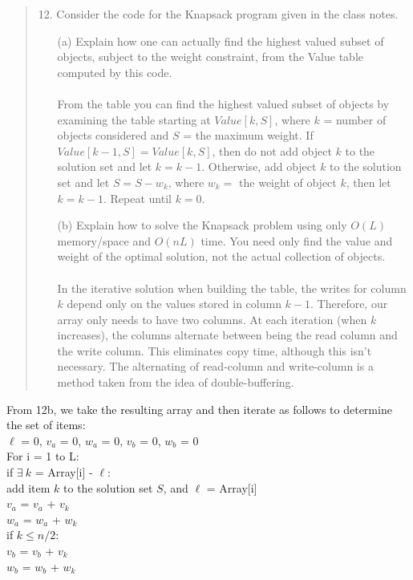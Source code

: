 \documentclass[10pt]{article}
\newcommand{\tab}{\hspace*{2em}}
\newcommand{\tabb}{\hspace*{4em}}
\newcommand{\tabbb}{\hspace*{6em}}
\newcommand{\tabbbb}{\hspace*{8em}}
\begin{document}
\begin{enumerate}
							\begin{quotation}
								12. 	Consider the code for the Knapsack program given in the class notes.
								\begin{enumerate}
								\item[(a)]	Explain how one can actually find the highest valued subset of objects, subject to the weight
														constraint, from the Value table computed by this code.\\
														\\
														From the table you can find the highest valued subset of objects by examining the table starting
														at $Value[k,S]$, where $k$ = number of objects considered and $S$ = the maximum weight. If
														$Value[k-1,S] = Value[k,S]$, then do not add object $k$ to the solution set and let $k = k - 1$. 
														Otherwise, add object $k$ to the solution set and let $S=S-w_k$, where $w_k = $
														the weight of object $k$, then let $k=k-1$. Repeat until $k=0$.
								\item[(b)]	Explain how to solve the Knapsack problem using only $O(L)$ memory/space and $O(nL)$ time. You
														need only find the value and weight of the optimal solution, not the actual collection of objects.\\
														\\
														In the iterative solution when building the table, the writes for column $k$ depend only on the values
														stored in column $k-1$. Therefore, our array only needs to have two columns. At each iteration (when $k$ increases),
														the columns alternate between being the read column and the write column. This eliminates copy time, although
														this isn't necessary. The alternating of read-column and write-column is a method taken from the idea of
														double-buffering.
								\end{enumerate}			
							\end{quotation}
							
							From 12b, we take the resulting array and then iterate as follows to determine the set of items:\\
							$\ell$ = 0, $v_a$ = 0, $w_a$ = 0, $v_b$ = 0, $w_b$ = 0\\
							\tab For i = 1 to L:\\
							\tabb if $\exists~k$ = Array[i] - $\ell$:\\
							\tabbb add item $k$ to the solution set $S$, and $\ell$ = Array[i]\\
							\tabbb $v_a$ = $v_a$ + $v_k$\\ 
							\tabbb $w_a$ = $w_a$ + $w_k$\\
							\tabbb if $k \leq n/2$:\\
							\tabbbb $v_b$ = $v_b$ + $v_k$\\ 
							\tabbbb $w_b$ = $w_b$ + $w_k$\\
							

\end{enumerate}
\end{document}
